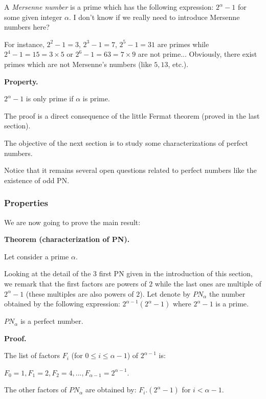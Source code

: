 A \textit{Mersenne number} is a prime which has the following expression: $2^\alpha-1$ for some given integer $\alpha$.
{\Denis I don't know if we really need to introduce Mersenne numbers here?}

For instance, $2^2-1=3$, $2^3-1=7$, $2^5-1=31$ are primes while $2^4-1=15=3 \times 5$ or $2^6-1=63=7 \times 9$ are not prime...
Obviously, there exist primes which are not Mersenne's numbers (like $5, 13$, etc.). 
\medskip

\noindent
\textbf{Property.}
\label{prop:MersennePrimes}

\noindent 
$2^\alpha-1$ is only prime if $\alpha$ is prime.
\medskip

The proof is a direct consequence of the little Fermat theorem (proved in the last section).

The objective of the next section is to study some characterizations of perfect numbers.
\medskip

Notice that it remains several open questions related to perfect numbers like the existence of odd PN.


\subsubsection{Properties}

We are now going to prove the main result:
\bigskip

\noindent
\textbf{Theorem (characterization of PN).}

\noindent 
Let consider a prime $\alpha$. 

Looking at the detail of the 3 first PN given in the introduction of this section, we remark that the first factors are powers of $2$ while the last ones are multiple of $2^\alpha-1$
(these multiples are also powers of $2$).
Let denote by $PN_\alpha$ the number obtained by the following expression:
$2^{\alpha-1}(2^\alpha-1)$ where $2^\alpha-1$ is a prime.

$PN_\alpha$ is a perfect number.
\bigskip

\noindent 
\textbf{Proof.}

The list of factors $F_i$ (for $0 \leq i \leq \alpha-1$) of $2^{\alpha-1}$ is: 

$F_0=1, F_1=2, F_2=4, ..., F_{\alpha-1}=2^{\alpha-1}$.

The other factors of $PN_\alpha$ are obtained by: $F_i.(2^\alpha-1)$ for $i < \alpha-1$.

